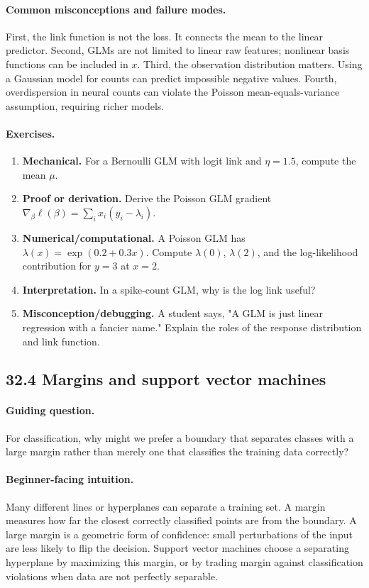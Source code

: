 \paragraph{Common misconceptions and failure modes.}
First, the link function is not the loss. It connects the mean to the linear predictor. Second, GLMs are not limited to linear raw features; nonlinear basis functions can be included in \(x\). Third, the observation distribution matters. Using a Gaussian model for counts can predict impossible negative values. Fourth, overdispersion in neural counts can violate the Poisson mean-equals-variance assumption, requiring richer models.

\paragraph{Exercises.}
\begin{enumerate}[label=\textbf{32.3.\arabic*.}, leftmargin=*]
\item \textbf{Mechanical.} For a Bernoulli GLM with logit link and \(\eta=1.5\), compute the mean \(\mu\).
\item \textbf{Proof or derivation.} Derive the Poisson GLM gradient \(\nabla_\beta \ell(\beta)=\sum_i x_i(y_i-\lambda_i)\).
\item \textbf{Numerical/computational.} A Poisson GLM has \(\lambda(x)=\exp(0.2+0.3x)\). Compute \(\lambda(0)\), \(\lambda(2)\), and the log-likelihood contribution for \(y=3\) at \(x=2\).
\item \textbf{Interpretation.} In a spike-count GLM, why is the log link useful?
\item \textbf{Misconception/debugging.} A student says, "A GLM is just linear regression with a fancier name." Explain the roles of the response distribution and link function.
\end{enumerate}

\subsection{32.4 Margins and support vector machines}

\paragraph{Guiding question.}
For classification, why might we prefer a boundary that separates classes with a large margin rather than merely one that classifies the training data correctly?

\paragraph{Beginner-facing intuition.}
Many different lines or hyperplanes can separate a training set. A margin measures how far the closest correctly classified points are from the boundary. A large margin is a geometric form of confidence: small perturbations of the input are less likely to flip the decision. Support vector machines choose a separating hyperplane by maximizing this margin, or by trading margin against classification violations when data are not perfectly separable.


